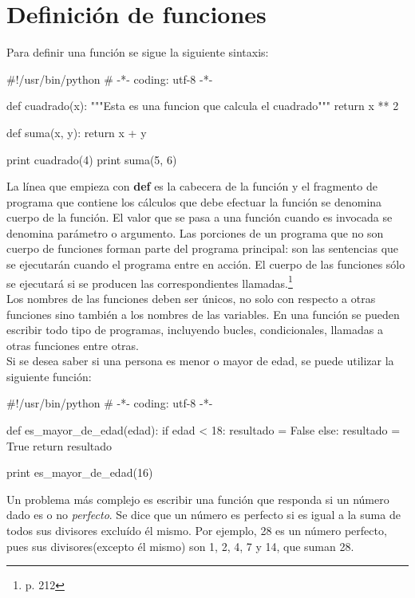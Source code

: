 \section{Definición de funciones}

Para definir una función se sigue la siguiente sintaxis:\\

\begin{pyglist} [language=python]
#!/usr/bin/python
# -*- coding: utf-8 -*-

def cuadrado(x):
    """Esta es una funcion que calcula el cuadrado"""
    return x ** 2

def suma(x, y):
    return x + y

print cuadrado(4)
print suma(5, 6)
\end{pyglist}

La línea que empieza con \textbf{def} es la cabecera de la función y el fragmento de programa que contiene los cálculos que debe efectuar la función se denomina cuerpo de la función. El valor que se pasa a una función cuando es invocada se denomina parámetro o argumento. Las porciones de un programa que no son cuerpo de funciones forman parte del programa principal: son las sentencias que se ejecutarán cuando el programa entre en acción. El cuerpo de las funciones sólo se ejecutará si se producen las correspondientes llamadas.\footnote{\cite{Marzal2003} p. 212}\\

Los nombres de las funciones deben ser únicos, no solo con respecto a otras funciones sino también a los nombres de las variables. En una función se pueden escribir todo tipo de programas, incluyendo bucles, condicionales, llamadas a otras funciones entre otras.\\

Si se desea saber si una persona es menor o mayor de edad, se puede utilizar la siguiente función:\\

\begin{pyglist} [language=python]
#!/usr/bin/python
# -*- coding: utf-8 -*-

def es_mayor_de_edad(edad):
    if edad < 18:
        resultado = False
    else:
        resultado = True
    return resultado
    
print es_mayor_de_edad(16)
\end{pyglist}

Un problema más complejo es escribir una función que responda si un número dado es o no \textit{perfecto}. Se dice que un número es perfecto si es igual a la suma de todos sus divisores excluído él mismo. Por ejemplo, 28 es un número perfecto, pues sus divisores(excepto él mismo) son 1, 2, 4, 7 y 14, que suman 28.\\

